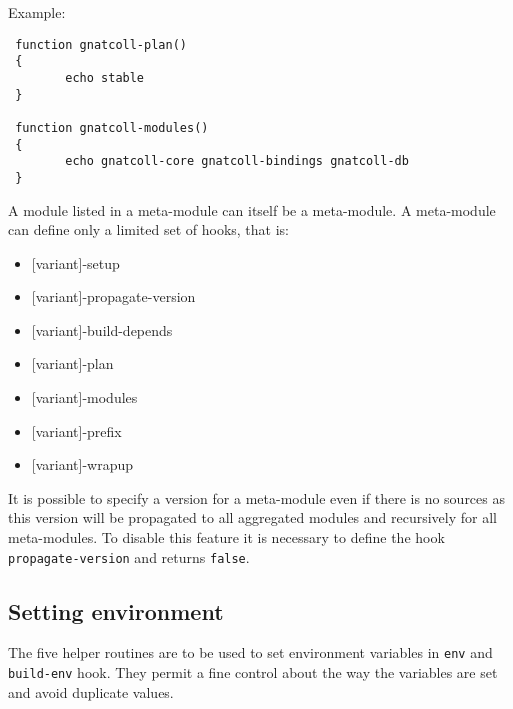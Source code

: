 \documentclass[a4paper,12pt,twoside]{article}
\newcommand{\code}[1]{\texttt{#1}}
\begin{document}
Example:

\begin{lstlisting}
 function gnatcoll-plan()
 {
		echo stable
 }

 function gnatcoll-modules()
 {
		echo gnatcoll-core gnatcoll-bindings gnatcoll-db
 }
\end{lstlisting}

A module listed in a meta-module can itself be a meta-module. A meta-module can define only a limited set of hooks, that is:

\begin{itemize}[font=\texttt]
	\item {[variant]-setup}
	\item {[variant]-propagate-version}
	\item {[variant]-build-depends}
	\item {[variant]-plan}
	\item {[variant]-modules}
	\item {[variant]-prefix}
	\item {[variant]-wrapup}
\end{itemize}

It is possible to specify a version for a meta-module even if there is no sources as this version will be propagated to all aggregated modules and recursively for all meta-modules. To disable this feature it is necessary to define the hook \code{propagate-version} and returns \code{false}.

\subsection{Setting environment}
\label{set-env}

The five helper routines are to be used to set environment variables in \code{env} and \code{build-env} hook. They permit a fine control about the way the variables are set and avoid duplicate values.
\end{document}
